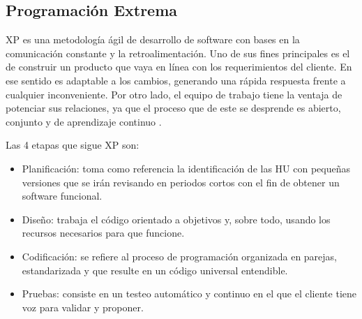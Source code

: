 \subsection{Programación Extrema}
    
\ac{XP} es una metodología ágil de desarrollo de software con bases en la comunicación 
constante y la retroalimentación. Uno de sus fines principales es el de construir un 
producto que vaya en línea con los requerimientos del cliente. En ese sentido es adaptable 
a los cambios, generando una rápida respuesta frente a cualquier inconveniente. 
Por otro lado, el equipo de trabajo tiene la ventaja de potenciar sus relaciones, 
ya que el proceso que de este se desprende es abierto, conjunto y de aprendizaje 
continuo \citep{pressman2014se}. 
    
Las 4 etapas que sigue \ac{XP} son:  
\begin{itemize}
	\item Planificación: toma como referencia la identificación de las \ac{HU} con pequeñas versiones que se irán revisando en periodos cortos con el fin de obtener un software funcional.
	\item Diseño: trabaja el código orientado a objetivos y, sobre todo, usando los recursos necesarios para que funcione. 
	\item Codificación: se refiere al proceso de programación organizada en parejas, estandarizada y que resulte en un código universal entendible. 
	\item Pruebas: consiste en un testeo automático y continuo en el que el cliente tiene voz para validar y proponer.
\end{itemize}
    

